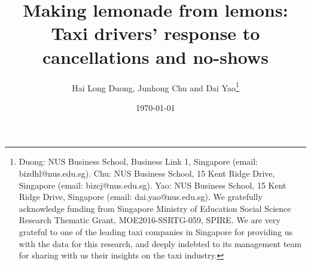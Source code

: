 \documentclass[draftmode]{AEA}
\begin{document}
\title{Making lemonade from lemons: Taxi drivers' response to cancellations and no-shows}
\author{Hai Long Duong, Junhong Chu and Dai Yao\thanks{Duong: NUS Business School, Business Link 1, Singapore (email: bizdhl@nus.edu.sg). Chu: NUS Business School, 15 Kent Ridge Drive, Singapore (email: bizcj@nus.edu.sg). Yao: NUS Business School, 15 Kent Ridge Drive, Singapore (email: dai.yao@nus.edu.sg). We gratefully acknowledge funding from Singapore Ministry of Education Social Science Research Thematic Grant, MOE2016-SSRTG-059, SPIRE. We are very grateful to one of the leading taxi companies in Singapore for providing us with the data for this research, and deeply indebted to its management team for sharing with us their insights on the taxi industry.}}
\date{\today}


\begin{abstract}
\end{abstract}

\maketitle
\thispagestyle{empty}
\end{document}

